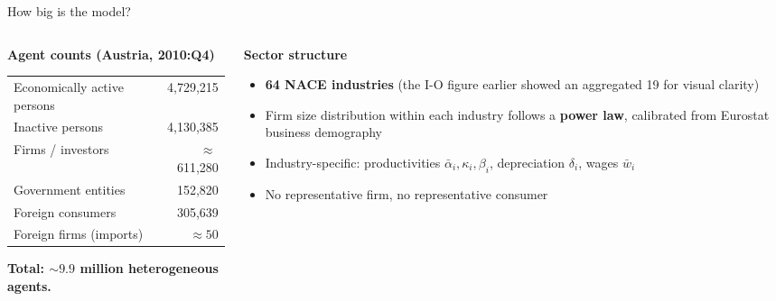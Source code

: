 \documentclass[9pt]{beamer}
\begin{document}
\begin{frame}{How big is the model?}
    \begin{columns}
    \begin{column}{0.5\textwidth}
    \textbf{Agent counts (Austria, 2010:Q4)}
    \footnotesize
    \begin{tabular}{lr}
        \toprule
        Economically active persons & 4{,}729{,}215 \\
        Inactive persons            & 4{,}130{,}385 \\
        Firms / investors\footnotemark & $\approx\,$611{,}280 \\
        Government entities         & 152{,}820 \\
        Foreign consumers           & 305{,}639 \\
        Foreign firms (imports)     & $\approx 50$ \\
        \bottomrule
    \end{tabular}
    \normalsize
    \vspace{0.5em}

    \textbf{Total: $\sim 9.9$ million heterogeneous agents.}
    \end{column}
    \begin{column}{0.5\textwidth}
    \textbf{Sector structure}
    \begin{itemize}\footnotesize
        \item \textbf{64 NACE industries} (the I-O figure earlier showed an aggregated 19 for visual clarity)
        \item Firm size distribution within each industry follows a \textbf{power law}, calibrated from Eurostat business demography
        \item Industry-specific: productivities $\bar{\alpha}_i, \kappa_i, \beta_i$, depreciation $\delta_i$, wages $\bar{w}_i$
        \item No representative firm, no representative consumer
    \end{itemize}
    \end{column}
    \end{columns}
\end{frame}
\end{document}
